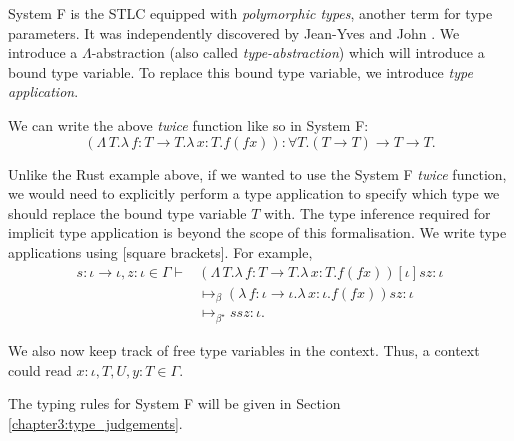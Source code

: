 System F is the STLC equipped with \textit{polymorphic types}, another term for type parameters. It
was independently discovered by Jean-Yves \citet{girard_interpretation_1972} and John
\citet{goos_towards_1974}. We introduce a $\Lambda$-abstraction (also called
\textit{type-abstraction}) which will introduce a bound type variable. To replace this bound type
variable, we introduce \textit{type application}.

We can write the above \textit{twice} function like so in System F:
\begin{equation*}
  (\Lambda \, T. \lambda \, f \colon T \to T . \lambda \, x \colon T . f (f x))
  \colon \forall T . (T \to T) \to T \to T.
\end{equation*}

Unlike the Rust example above, if we wanted to use the System F \textit{twice} function, we would
need to explicitly perform a type application to specify which type we should replace the bound type
variable $T$ with. The type inference required for implicit type application is beyond the scope of
this formalisation. We write type applications using [square brackets]. For example,
\begin{align*}
  s \colon \iota \to \iota, z \colon \iota \in \Gamma \vdash
    &(\Lambda \, T. \lambda \, f \colon T \to T . \lambda \, x \colon T . f (f x))
    [\iota] s z \colon \iota\\
  &\mapsto_{\beta}
    (\lambda \, f \colon \iota \to \iota . \lambda \, x \colon \iota . f (f x)) s z \colon \iota\\
  &\mapsto_{\beta^{\star}} s s z \colon \iota.
\end{align*}

We also now keep track of free type variables in the context. Thus, a context could read $x \colon
\iota, T, U, y \colon T \in \Gamma$.

The typing rules for System F will be given in Section \ref{chapter3:type_judgements}.
